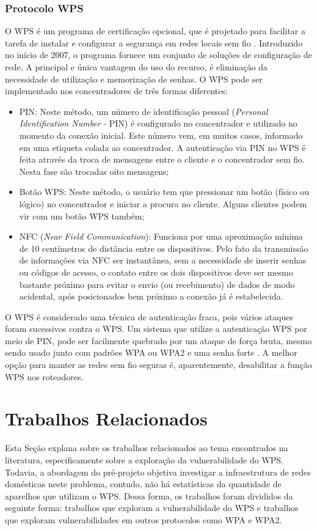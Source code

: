 \documentclass[
	article,			%
	11pt,				%
	oneside,			%
	a4paper,			%
	english,			%
	brazil,				%
	sumario=tradicional
	]{abntex2}
\begin{document}
\subsubsection{Protocolo WPS}
O WPS é um programa de certificação opcional, que é projetado para facilitar a tarefa de instalar e configurar a segurança em redes locais sem fio \cite{viehbock2011brute}. Introduzido no início de 2007, o programa fornece um conjunto de soluções de configuração de rede. A principal e única vantagem do uso do recurso, é eliminação da necessidade de utilização e memorização de senhas. O WPS pode ser implementado nos concentradores de três formas diferentes: 
\begin{itemize}
   \item PIN: Neste método, um número de identificação pessoal (\textit{Personal Identification Number} - PIN) é configurado no concentrador e utilizado no momento da conexão inicial. Este número vem, em muitos casos, informado em uma etiqueta colada ao concentrador. A autenticação via PIN no WPS é feita através da troca de mensagens entre o cliente e o concentrador sem fio. Nesta fase são trocadas oito mensagens; 
   \item Botão WPS: Neste método, o usuário tem que pressionar um botão (físico ou lógico) no concentrador e iniciar a procura no cliente. Alguns clientes podem vir com um botão WPS também;
   \item NFC (\textit{Near Field Communication}): Funciona por uma aproximação mínima de 10 centímetros de distância entre os dispositivos. Pelo fato da transmissão de informações via NFC ser instantânea, sem a necessidade de inserir senhas ou códigos de acesso, o contato entre os dois dispositivos deve ser mesmo bastante próximo para evitar o envio (ou recebimento) de dados de modo acidental, após posicionados bem próximo a conexão já é estabelecida.
 
\end{itemize}

O WPS é considerado uma técnica de autenticação fraca, pois vários ataques foram sucessivos contra o WPS. Um sistema que utilize a autenticação WPS por meio de PIN, pode ser facilmente quebrado por um ataque de força bruta, mesmo sendo usado junto com padrões WPA ou WPA2 e uma senha forte \cite{silva2014vulnerabilidade}. A melhor opção para manter as redes sem fio seguras é, aparentemente, desabilitar a função WPS nos roteadores. 

\section{Trabalhos Relacionados}
Esta Seção explana sobre os trabalhos relacionados ao tema encontrados na literatura, especificamente sobre a exploração da vulnerabilidade do WPS. Todavia, a abordagem do pré-projeto objetiva investigar a infraestrutura de redes domésticas neste problema, contudo, não há estatísticas da quantidade de aparelhos que utilizam o WPS. Dessa forma, os trabalhos foram divididos da seguinte forma: trabalhos que exploram a vulnerabilidade do WPS e trabalhos que exploram vulnerabilidades em outros protocolos como WPA e WPA2.  
\end{document}
